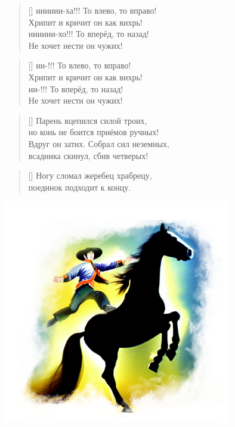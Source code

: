 \documentclass[a5paper,11pt]{memoir}
\begin{document}
\ifluatex
\begin{verse}[\versewidth]
	ии{\fontsize{14pt}{16pt}\selectfont ии}{\fontsize{16pt}{18pt}\selectfont ии}-{\fontsize{18pt}{20pt}\selectfont ха!!!} То влево, то вправо! \\
	Хрипит и кричит он как вихрь! \\
	ии{\fontsize{14pt}{16pt}\selectfont ии}{\fontsize{16pt}{18pt}\selectfont ии}-{\fontsize{18pt}{20pt}\selectfont хо!!!} То вперёд, то назад! \\
	Не хочет нести он чужих! \\
\end{verse}
\else
	\begin{verse}[\versewidth]
	ии{}{}-{!!!} То влево, то вправо! \\
	Хрипит и кричит он как вихрь! \\
	ии{}{}-{!!!} То вперёд, то назад! \\
	Не хочет нести он чужих! \\
	\end{verse}
\fi

\begin{verse}[\versewidth]
Парень вцепился силой троих, \\
но конь не боится приёмов ручных! \\
Вдруг он затих. Собрал сил неземных,  \\
всадника скинул, сбив четверых! \\
\end{verse}

\begin{verse}[\versewidth]
Ногу сломал жеребец храбрецу, \\
поединок подходит к концу. \\
\end{verse}

\vspace{-1cm}
\hspace{1cm}\includegraphics[width=10cm]{images/falling-rider.png}
\end{document}
